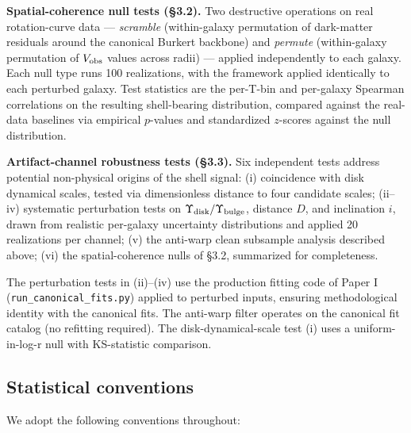 \documentclass[linenumbers,trackchanges]{aastex701}
\begin{document}
\textbf{Spatial-coherence null tests (\S3.2).} Two destructive operations on real rotation-curve data --- \emph{scramble} (within-galaxy permutation of dark-matter residuals around the canonical Burkert backbone) and \emph{permute} (within-galaxy permutation of $V_{\rm obs}$ values across radii) --- applied independently to each galaxy. Each null type runs 100 realizations, with the framework applied identically to each perturbed galaxy. Test statistics are the per-T-bin and per-galaxy Spearman correlations on the resulting shell-bearing distribution, compared against the real-data baselines via empirical $p$-values and standardized $z$-scores against the null distribution.

\textbf{Artifact-channel robustness tests (\S3.3).} Six independent tests address potential non-physical origins of the shell signal: (i) coincidence with disk dynamical scales, tested via dimensionless distance to four candidate scales; (ii--iv) systematic perturbation tests on $\Upsilon_{\rm disk}/\Upsilon_{\rm bulge}$, distance $D$, and inclination $i$, drawn from realistic per-galaxy uncertainty distributions and applied 20 realizations per channel; (v) the anti-warp clean subsample analysis described above; (vi) the spatial-coherence nulls of \S3.2, summarized for completeness.

The perturbation tests in (ii)--(iv) use the production fitting code of Paper I (\texttt{run\_canonical\_fits.py}) applied to perturbed inputs, ensuring methodological identity with the canonical fits. The anti-warp filter operates on the canonical fit catalog (no refitting required). The disk-dynamical-scale test (i) uses a uniform-in-log-r null with KS-statistic comparison.

\subsection{Statistical conventions}

We adopt the following conventions throughout:
\end{document}
